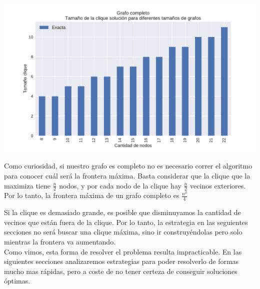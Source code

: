 {\centering
    \includegraphics[width=1\textwidth]{informe/imgs/exp_completo_clique_exacta.pdf} \\
}

Como curiosidad, si nuestro grafo es completo no es necesario correr el algoritmo para conocer cuál será la frontera máxima. Basta considerar que la clique que la maximiza tiene $\frac{n}{2}$ nodos, y por cada nodo de la clique hay $\frac{n}{2}$ vecinos exteriores. Por lo tanto, la frontera máxima de un grafo completo es $\frac{n^2}{4}$


Si la clique es demasiado grande, es posible que disminuyamos la cantidad de vecinos que están fuera de la clique. Por lo tanto, la estrategia en las seguientes secciones no será buscar una clique máxima, sino ir construyéndolas pero solo mientras la frontera va aumentando. \\

Como vimos, esta forma de resolver el problema resulta impracticable. En las siguientes secciones analizaremos estrategias para poder resolverlo de formas mucho mas rápidas, pero a coste de no tener certeza de conseguir soluciones óptimas.
